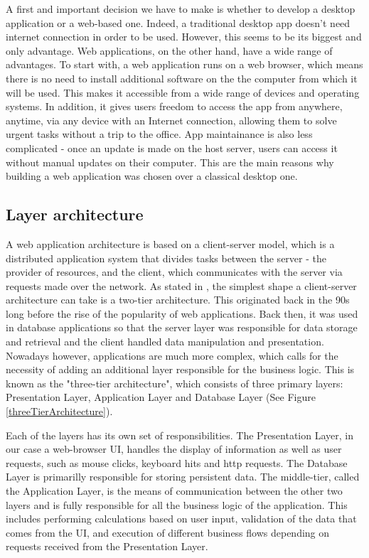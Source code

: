 A first and important decision we have to make is whether to develop a desktop application or a web-based one. Indeed, a traditional desktop app doesn't need internet connection in order to be used. However, this seems to be its biggest and only advantage. Web applications, on the other hand, have a wide range of advantages. To start with, a web application runs on a web browser, which means there is no need to install additional software on the the computer from which it will be used. This makes it accessible from a wide range of devices and operating systems. In addition, it gives users freedom to access the app from anywhere, anytime, via any device with an Internet connection, allowing them to solve urgent tasks without a trip to the office. App maintainance is also less complicated - once an update is made on the host server, users can access it without manual updates on their computer. This are the main reasons why building a web application was chosen over a classical desktop one.

\subsection{Layer architecture}
\label{subsection:layerArchitecture}

A web application architecture is based on a client-server model, which is a distributed application system that divides tasks between the server - the provider of resources, and the client, which communicates with the server via requests made over the network. As stated in \cite{databaseProgrammingWithJdbcAndJava}, the simplest shape a client-server architecture can take is a two-tier architecture. This originated back in the 90s long before the rise of the popularity of web applications. Back then, it was used in database applications so that the server layer was responsible for data storage and retrieval and the client handled data manipulation and presentation. Nowadays however, applications are much more complex, which calls for the necessity of adding an additional layer responsible for the business logic. This is known as the "three-tier architecture", which consists of three primary layers: Presentation Layer, Application Layer and Database Layer (See Figure \ref{threeTierArchitecture}).

Each of the layers has its own set of responsibilities. The Presentation Layer, in our case a web-browser UI, handles the display of information as well as user requests, such as mouse clicks, keyboard hits and http requests. The Database Layer is primarilly responsible for storing persistent data. The middle-tier, called the Application Layer, is the means of communication between the other two layers and is fully responsible for all the business logic of the application. This includes performing calculations based on user input, validation of the data that comes from the UI, and execution of different business flows depending on requests received from the Presentation Layer.

